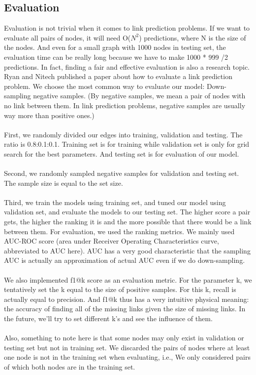 \documentclass[12pt]{article}
\begin{document}
	\subsection{Evaluation}
	Evaluation is not trivial when it comes to link prediction problems. If we want to evaluate all pairs of nodes, it will need O($N^2$) predictions, where N is the size of the nodes. And even for a small graph with 1000 nodes in testing set, the evaluation time can be really long because we have to make 1000 * 999 /2 predictions. In fact, finding a fair and effective evaluation is also a research topic. Ryan and Nitech published a paper \cite{eval} about how to evaluate a link prediction problem. We choose the most common way to evaluate our model: Down-sampling negative samples. (By negative samples, we mean a pair of nodes with no link between them. In link prediction problems, negative samples are usually way more than positive ones.)
	\\
	\\
	First, we randomly divided our edges into training, validation and testing. The ratio is 0.8:0.1:0.1. Training set is for training while validation set is only for grid search for the best parameters. And testing set is for evaluation of our model. 
	\\
	\\
	Second, we randomly sampled negative samples for validation and testing set. The sample size is equal to the set size.
	\\
	\\
	Third, we train the models using training set, and tuned our model using validation set, and evaluate the models to our testing set. The higher score a pair gets, the higher the ranking it is and the more possible that there would be a link between them. For evaluation, we used the ranking metrics. We mainly used AUC-ROC score (area under Receiver Operating Characteristics curve, abbreviated to AUC here). AUC has a very good characteristic that the sampling AUC is actually an approximation of actual AUC even if we do down-sampling. 
	\\
	\\
	We also implemented f1@k score as an evaluation metric. For the parameter k, we tentatively set the k equal to the size of positive samples. For this k, recall is actually equal to precision. And f1@k thus has a very intuitive physical meaning: the accuracy of finding all of the missing links given the size of missing links. In the future, we'll try to set different k's and see the influence of them. 
	\\
	\\
	Also, something to note here is that some nodes may only exist in validation or testing set but not in training set. We discarded the pairs of nodes where at least one node is not in the training set when evaluating, i.e., We only considered pairs of which both nodes are in the training set.
	
\end{document}
